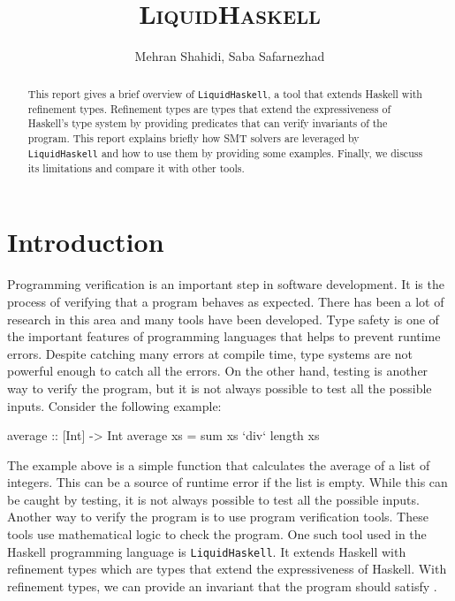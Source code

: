 \documentclass[]{rptuseminar}
\title{\textsc{Liquid}{H}\textsc{askell}}
\author{Mehran Shahidi, Saba Safarnezhad
  \institute{Rheinland-Pfälzische Technische Universität Kaiserslautern-Landau, Department of Computer Science}}
\begin{document}

\maketitle


\begin{abstract}
  This report gives a brief overview of \texttt{LiquidHaskell}, a tool that extends Haskell with refinement types. 
  Refinement types are types that extend the expressiveness of Haskell's type system by providing predicates that can verify invariants of the program. 
  This report explains briefly how SMT solvers are leveraged by \texttt{LiquidHaskell} and 
  how to use them by providing some examples. Finally, we discuss its limitations and compare it with other tools.
\end{abstract}


\section{Introduction}
\label{sec:introduction}
Programming verification is an important step in software development. It is the process of
verifying that a program behaves as expected. There has been a lot of research in this 
area and many tools have been developed. 
Type safety is one of the important features of programming languages that helps to prevent runtime errors.
Despite catching many errors at compile time, type systems are not powerful enough to catch all the errors.
On the other hand, testing is another way to verify the program, but it is not always possible to test all the possible inputs.
Consider the following example:

\begin{haskell}
  average    :: [Int] -> Int
  average xs = sum xs `div` length xs
\end{haskell}

The example above is a simple function that calculates the average of a list of integers. This can be a source of runtime
error if the list is empty. While this can be caught by testing, it is not always possible to test all the possible inputs.
Another way to verify the program is to use program verification tools. These tools use mathematical logic to check the program.
One such tool used in the Haskell programming language is \texttt{LiquidHaskell}. It 
 extends Haskell with refinement types which are types that extend the expressiveness of Haskell.
With refinement types, we can provide an invariant that the program should satisfy \cite{jhala_programming_2020}. 
\end{document}
